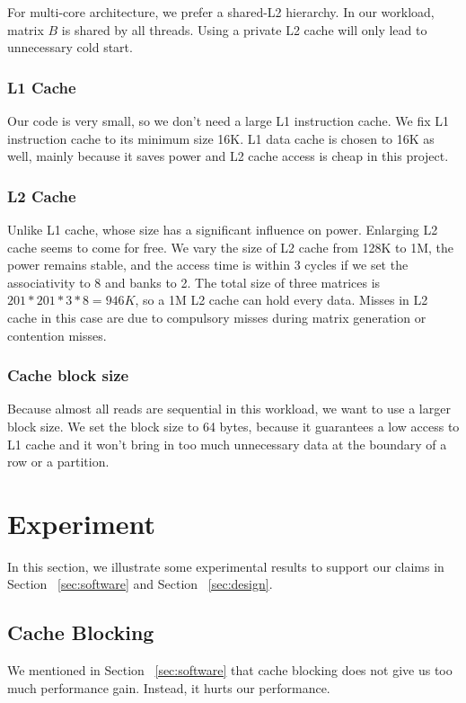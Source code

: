 \documentclass[twocolumn,letterpaper,10pt]{article}
\begin{document}
For multi-core architecture, we prefer a shared-L2 hierarchy. 
In our workload, matrix $B$ is shared by all
threads. Using a private L2 cache will only lead to unnecessary cold
start.  

\subsubsection{L1 Cache}
Our code is very small, so we don't need a large L1 instruction
cache. We fix L1 instruction cache to its minimum size 16K. L1 data
cache is chosen to 16K as well, mainly because it saves power and L2
cache access is cheap in this project.

\subsubsection{L2 Cache}
Unlike L1 cache, whose size has a significant influence on
power. Enlarging L2 cache seems to come for free. We vary the size of
L2 cache from 128K to 1M, the power remains stable, and the access
time is within 3 cycles if we set the associativity to 8 and banks to
2. The total size of three matrices is $201 * 201 * 3 * 8 = 946K$, so
a 1M L2 cache can hold every data. Misses in L2 cache in this case are
due to compulsory misses during matrix generation or contention
misses.

\subsubsection{Cache block size}
Because almost all reads are sequential in this workload, we want to
use a larger block size. We set the block size to 64
bytes, because it guarantees a low access to L1 cache and it won't
bring in too much unnecessary data at the boundary of a row or a partition.

\section{Experiment}
\label{sec:exp}
In this section, we illustrate some experimental results to support
our claims in Section ~\ref{sec:software} and Section ~\ref{sec:design}.
 
\subsection{Cache Blocking}
We mentioned in Section ~\ref{sec:software} that cache blocking does not give us
too much performance gain. Instead, it hurts our performance.
\end{document}
